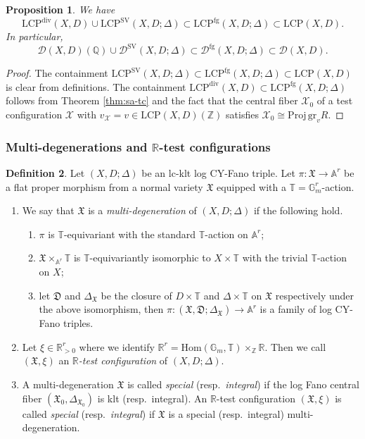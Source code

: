 \documentclass[reqno, 12pt]{amsart}
\newtheorem{prop}{Proposition}[section]
\theoremstyle{definition}
\newtheorem{defn}[prop]{Definition}
\newcommand{\bR}{\mathbb{R}}
\newcommand{\bA}{\mathbb{A}}
\newcommand{\bQ}{\mathbb{Q}}
\newcommand{\bZ}{\mathbb{Z}}
\newcommand{\bG}{\mathbb{G}}
\newcommand{\bT}{\mathbb{T}}
\newcommand{\cX}{\mathcal{X}}
\newcommand{\cD}{\mathcal{D}}
\newcommand{\Hom}{\mathrm{Hom}}
\newcommand{\gr}{\mathrm{gr}}
\newcommand{\Proj}{\mathrm{Proj}}
\newcommand{\fX}{\mathfrak{X}}
\newcommand{\fD}{\mathfrak{D}}
\newcommand{\SV}{\mathrm{SV}}
\newcommand{\rfg}{\mathrm{fg}}
\newcommand{\LCP}{\mathrm{LCP}}
\newcommand{\rdiv}{\mathrm{div}}
\numberwithin{equation}{section}
\begin{document}
\begin{prop}\label{prop:div-fg}
We have 
\[
\LCP^{\rdiv}(X,D)\cup \LCP^{\SV}(X,D;\Delta) \subset \LCP^{\rfg}(X,D;\Delta) \subset \LCP(X,D).
\]
In particular,
\[
\cD(X,D)(\bQ)\cup \cD^{\SV}(X,D;\Delta) \subset \cD^{\rfg}(X,D;\Delta) \subset \cD(X,D).
\]
\end{prop}

\begin{proof}
The containment $\LCP^{\SV}(X,D;\Delta) \subset \LCP^{\rfg}(X,D;\Delta) \subset \LCP(X,D)$ is clear from definitions. The containment $\LCP^{\rdiv}(X,D) \subset \LCP^{\rfg}(X,D;\Delta)$ follows from Theorem \ref{thm:sa-tc} and the fact that the central fiber $\cX_0$ of a test configuration $\cX$ with $v_{\cX}= v\in \LCP(X,D)(\bZ)$ satisfies $\cX_0 \cong \Proj\,\gr_v R$.
\end{proof}

\subsubsection{Multi-degenerations and $\bR$-test configurations}

\begin{defn}\label{def:multideg}
Let $(X,D;\Delta)$ be an lc-klt log CY-Fano triple. Let $\pi: \fX \to \bA^r$ be a flat proper morphism from a normal variety $\fX$ equipped with a $\bT=\bG_m^r$-action. 

\begin{enumerate}
    \item We say that $\fX$ is a \emph{multi-degeneration} of $(X,D;\Delta)$ if the following hold.
    \begin{enumerate}[label=(\roman*)]
        \item $\pi$ is $\bT$-equivariant with the standard $\bT$-action on $\bA^r$;
        \item $\fX\times_{\bA^r} \bT$ is $\bT$-equivariantly isomorphic to $X\times \bT$ with the trivial $\bT$-action on $X$;
        \item let $\fD$ and $\Delta_{\fX}$ be the closure of $D\times \bT$ and $\Delta\times \bT$ on $\fX$ respectively under the above isomorphism, then $\pi:(\fX,\fD;\Delta_{\fX})\to \bA^r$ is a family of log CY-Fano triples.
    \end{enumerate}
    \item Let $\xi \in \bR_{>0}^r$ where we identify $\bR^{r} = \Hom(\bG_m, \bT)\times_{\bZ} \bR$. Then we call $(\fX, \xi)$ an \emph{$\bR$-test configuration} of $(X,D;\Delta)$. 
    \item A multi-degeneration $\fX$ is called \emph{special} (resp.\ \emph{integral}) if the log Fano central fiber $(\fX_0, \Delta_{\fX_0})$ is klt (resp.\ integral). An $\bR$-test configuration $(\fX,\xi)$ is called \emph{special} (resp.\ \emph{integral}) if $\fX$ is a special (resp.\ integral) multi-degeneration.
\end{enumerate}

\end{defn}
\end{document}
